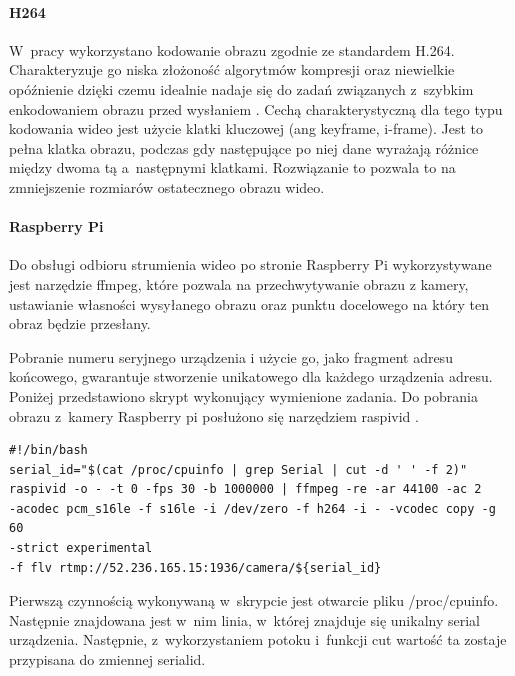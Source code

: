 \paragraph{H264}
W~pracy wykorzystano kodowanie obrazu zgodnie ze standardem H.264. Charakteryzuje go niska złożoność algorytmów kompresji oraz niewielkie opóźnienie dzięki czemu idealnie nadaje się do zadań związanych z~szybkim enkodowaniem obrazu przed wysłaniem \cite{H264}.
Cechą charakterystyczną dla tego typu kodowania wideo jest użycie klatki kluczowej (ang keyframe, i-frame). Jest to pełna klatka obrazu, podczas gdy następujące po niej dane wyrażają różnice między dwoma tą a~następnymi klatkami. Rozwiązanie to pozwala to na zmniejszenie rozmiarów ostatecznego obrazu wideo.

\paragraph{Raspberry Pi}
Do obsługi odbioru strumienia wideo po stronie Raspberry Pi wykorzystywane jest narzędzie ffmpeg, które pozwala na przechwytywanie obrazu z kamery, ustawianie własności wysyłanego obrazu oraz punktu docelowego na który ten obraz będzie przesłany.

Pobranie numeru seryjnego urządzenia i użycie go, jako fragment adresu końcowego, gwarantuje stworzenie unikatowego dla każdego urządzenia adresu. Poniżej przedstawiono skrypt wykonujący wymienione zadania. Do pobrania obrazu z~kamery Raspberry pi posłużono się narzędziem raspivid \cite{raspivid}.
\begin{verbatim}
#!/bin/bash
serial_id="$(cat /proc/cpuinfo | grep Serial | cut -d ' ' -f 2)"
raspivid -o - -t 0 -fps 30 -b 1000000 | ffmpeg -re -ar 44100 -ac 2 
-acodec pcm_s16le -f s16le -i /dev/zero -f h264 -i - -vcodec copy -g 60 
-strict experimental 
-f flv rtmp://52.236.165.15:1936/camera/${serial_id}
\end{verbatim}
Pierwszą czynnością wykonywaną w~skrypcie jest otwarcie pliku /proc/cpuinfo. Następnie znajdowana jest w~nim linia, w~której znajduje się unikalny serial urządzenia. Następnie, z~wykorzystaniem potoku i~funkcji cut wartość ta zostaje przypisana do zmiennej serialid.

